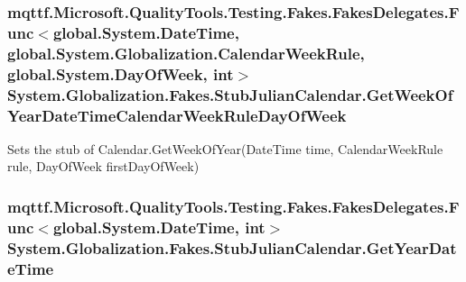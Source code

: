 \hypertarget{class_system_1_1_globalization_1_1_fakes_1_1_stub_julian_calendar_a8804a6d27ed2089cae5fdba378e79c1e}{
\subsubsection[{Get\-Week\-Of\-Year\-Date\-Time\-Calendar\-Week\-Rule\-Day\-Of\-Week}]{\setlength{\rightskip}{0pt plus 5cm}mqttf.\-Microsoft.\-Quality\-Tools.\-Testing.\-Fakes.\-Fakes\-Delegates.\-Func$<$global.\-System.\-Date\-Time, global.\-System.\-Globalization.\-Calendar\-Week\-Rule, global.\-System.\-Day\-Of\-Week, int$>$ System.\-Globalization.\-Fakes.\-Stub\-Julian\-Calendar.\-Get\-Week\-Of\-Year\-Date\-Time\-Calendar\-Week\-Rule\-Day\-Of\-Week}}\label{class_system_1_1_globalization_1_1_fakes_1_1_stub_julian_calendar_a8804a6d27ed2089cae5fdba378e79c1e}


Sets the stub of Calendar.\-Get\-Week\-Of\-Year(\-Date\-Time time, Calendar\-Week\-Rule rule, Day\-Of\-Week first\-Day\-Of\-Week)

\hypertarget{class_system_1_1_globalization_1_1_fakes_1_1_stub_julian_calendar_a0ddd14741fbba0d4eb42cb519a1d59b3}{
\subsubsection[{Get\-Year\-Date\-Time}]{\setlength{\rightskip}{0pt plus 5cm}mqttf.\-Microsoft.\-Quality\-Tools.\-Testing.\-Fakes.\-Fakes\-Delegates.\-Func$<$global.\-System.\-Date\-Time, int$>$ System.\-Globalization.\-Fakes.\-Stub\-Julian\-Calendar.\-Get\-Year\-Date\-Time}}\label{class_system_1_1_globalization_1_1_fakes_1_1_stub_julian_calendar_a0ddd14741fbba0d4eb42cb519a1d59b3}


